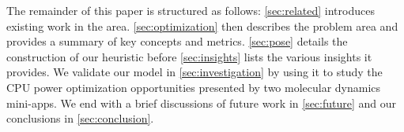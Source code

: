 The remainder of this paper is structured as follows: \autoref{sec:related} introduces existing work in the area. 
\autoref{sec:optimization} then describes the problem area and provides a summary of key concepts and metrics.
\autoref{sec:pose} details the construction of our heuristic before \autoref{sec:insights} lists the various insights it provides.
We validate our model in \autoref{sec:investigation} by using it to study the CPU power optimization opportunities presented by two molecular dynamics mini-apps. 
We end with a brief discussions of future work in \autoref{sec:future} and our conclusions in \autoref{sec:conclusion}.
